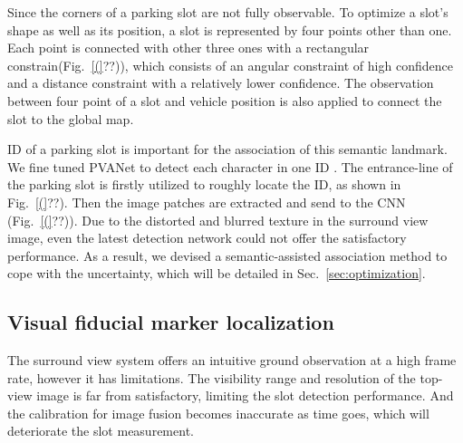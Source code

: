 \documentclass[journal]{IEEEtran}
\newcommand{\Reffig}[1]{Fig.~\ref{#1}}
\newcommand{\Refsec}[1]{Sec.~\ref{#1}}
\begin{document}
%
Since the corners of a parking slot are not fully observable.
To optimize a slot's shape as well as its position, a slot is represented by four points other than one.
Each point is connected with other three ones with a rectangular constrain(\Reffig(??)), which consists of an angular constraint of high confidence and a distance constraint with a relatively lower confidence.
The observation between four point of a slot and vehicle position is also applied to connect the slot to the global map.

%

ID of a parking slot is important for the association of this semantic landmark.
We fine tuned PVANet to detect each character in one ID \citep{Hong2016PVANet}.
The entrance-line of the parking slot is firstly utilized to roughly locate the ID, as shown in \Reffig(??).
Then the image patches are extracted and send to the CNN (\Reffig(??)).
Due to the distorted and blurred texture in the surround view image, even the latest detection network could not offer the satisfactory performance.
As a result, we devised a semantic-assisted association method to cope with the uncertainty, which will be detailed in \Refsec{sec:optimization}.  





\subsection{Visual fiducial marker localization}

The surround view system offers an intuitive ground observation at a high frame rate, however it has limitations. 
The visibility range and resolution of the top-view image is far from satisfactory, limiting the slot detection performance. 
And the calibration for image fusion becomes inaccurate as time goes, which will deteriorate the slot measurement.
\end{document}
